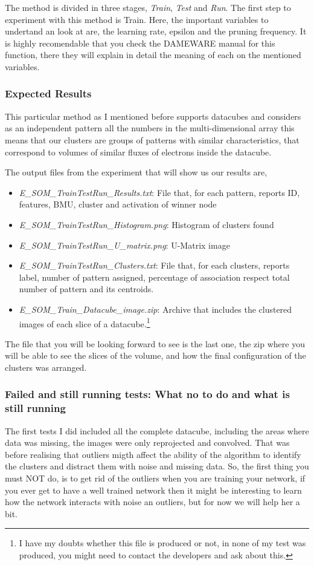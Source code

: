 \documentclass[11pt,fleqn]{book} %
\begin{document}
The method is divided in three stages, \emph{Train}, \emph{Test} and \emph{Run}.
The first step to experiment with this method is Train. Here, the important variables to undertand an look at are, the learning rate, epsilon and the pruning frequency. It is highly recomendable that you check the DAMEWARE manual for this function, there they will explain in detail the meaning of each on the mentioned variables.
\subsubsection{Expected Results}
	This particular method as I mentioned before supports datacubes and considers as an independent pattern all the  numbers in the multi-dimensional array this means that our clusters are groups of patterns with similar characteristics, that correspond to volumes of similar fluxes of electrons inside the datacube.
    
    The output files from the experiment that will show us our results are, 
    \begin{itemize}
    	\item \emph{E\_SOM\_Train\/Test\/Run\_Results.txt}: File that, for each pattern, 
reports ID, features, BMU, cluster and activation of winner node
		\item \emph{E\_SOM\_Train\/Test\/Run\_Histogram.png}: Histogram of clusters found 
        \item \emph{E\_SOM\_Train\/Test\/Run\_U\_matrix.png}: U-Matrix image 
        \item \emph{E\_SOM\_Train\/Test\/Run\_Clusters.txt}: File that, for each clusters, reports label, number of pattern assigned, percentage of association respect total number of pattern and its centroids. 
        \item \emph{E\_SOM\_Train\_Datacube\_image.zip}: Archive that includes the 
clustered images of each slice of a datacube.\footnote{I have my doubts whether this file is produced or not, in none of my test was produced, you might need to contact the developers and ask about this.}
    \end{itemize}
The file that you will be looking forward to see is the last one, the zip where you will be able to see the slices of the volume, and how the final configuration of the clusters was arranged.

\subsubsection{Failed and still running tests: What no to do and what is still running}
The first tests I did included all the complete datacube, including the areas where data was missing, the images were only reprojected and convolved. That was before realising that outliers migth affect the ability of the algorithm to identify the clusters and distract them with noise and missing data. So, the first thing you must NOT do, is to get rid of the outliers when you are training your network, if you ever get to have a well trained network then it might be interesting to learn how the network interacts with noise an outliers, but for now we will help her a bit. 
\end{document}
